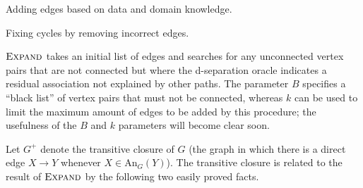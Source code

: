 \documentclass[accepted]{uai2025} %
\begin{document}
\begin{algorithm}[h]
\DontPrintSemicolon
\SetAlgoLined
{}
\caption{Adding edges based on data and domain knowledge.}
\label{algo:expand}
\end{algorithm}

\begin{algorithm}[h]
\DontPrintSemicolon
\SetAlgoLined
{}
\caption{Fixing cycles by removing incorrect edges.}
\label{algo:fix_cycles}
\end{algorithm}

$\textsc{Expand}$ takes an initial list of edges and searches for 
any unconnected vertex pairs that are not connected but where the
d-separation oracle indicates a residual association not explained 
by other paths.
The parameter $B$ specifies a ``black list''
of vertex pairs that must not be connected, 
whereas $k$
can be used to limit the maximum amount of edges 
to be added by this procedure; the usefulness of the $B$ and $k$
parameters will become clear soon.

Let $G^+$ denote the transitive closure of $G$ (the graph in which 
there is a direct edge $X \to Y$ whenever $X \in \textrm{An}_G(Y)$). 
The transitive closure is related to the result of $\textsc{Expand}$ 
by the following two easily proved facts.
\end{document}
